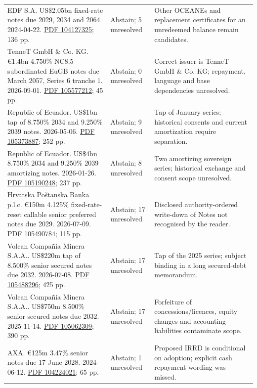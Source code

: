 \documentclass[12pt,a4paper,oneside,openany]{book}
\begin{document}
{\begin{longtable}{P{0.44\textwidth}P{0.12\textwidth}P{0.34\textwidth}}
EDF S.A. US\$2.05bn fixed-rate notes due 2029, 2034 and 2064. 2024-04-22. \href{../prospectus/difficulty-2026-10-04/pdfs/case-104127325.pdf}{PDF 104127325}; 136 pp. & Abstain; 5 unresolved & Other OCEANEs and replacement certificates for an unredeemed balance remain candidates. \\

TenneT GmbH \& Co. KG. €1.4bn 4.750\% NC8.5 subordinated EuGB notes due March 2057, Series 6 tranche 1. 2026-09-01. \href{../prospectus/difficulty-2026-10-04/pdfs/case-105577212.pdf}{PDF 105577212}; 45 pp. & Abstain; 0 unresolved & Correct issuer is TenneT GmbH \& Co. KG; repayment, language and base dependencies unresolved. \\

Republic of Ecuador. US\$1bn tap of 8.750\% 2034 and 9.250\% 2039 notes. 2026-05-06. \href{../prospectus/difficulty-2026-10-04/pdfs/case-105373887.pdf}{PDF 105373887}; 252 pp. & Abstain; 9 unresolved & Tap of January series; historical consents and current amortization require separation. \\

Republic of Ecuador. US\$4bn 8.750\% 2034 and 9.250\% 2039 amortizing notes. 2026-01-26. \href{../prospectus/difficulty-2026-10-04/pdfs/case-105190248.pdf}{PDF 105190248}; 237 pp. & Abstain; 8 unresolved & Two amortizing sovereign series; historical exchange and consent scope unresolved. \\

Hrvatska Poštanska Banka p.l.c. €150m 4.125\% fixed-rate-reset callable senior preferred notes due 2029. 2026-07-09. \href{../prospectus/difficulty-2026-10-04/pdfs/case-105490784.pdf}{PDF 105490784}; 115 pp. & Abstain; 17 unresolved & Disclosed authority-ordered write-down of Notes not recognised by the reader. \\

Volcan Compañía Minera S.A.A.. US\$220m tap of 8.500\% senior secured notes due 2032. 2026-07-08. \href{../prospectus/difficulty-2026-10-04/pdfs/case-105488296.pdf}{PDF 105488296}; 425 pp. & Abstain; 17 unresolved & Tap of the 2025 series; subject binding in a long secured-debt memorandum. \\

Volcan Compañía Minera S.A.A.. US\$750m 8.500\% senior secured notes due 2032. 2025-11-14. \href{../prospectus/difficulty-2026-10-04/pdfs/case-105062309.pdf}{PDF 105062309}; 390 pp. & Abstain; 17 unresolved & Forfeiture of concessions/licences, equity changes and accounting liabilities contaminate scope. \\

AXA. €125m 3.47\% senior notes due 17 June 2028. 2024-06-12. \href{../prospectus/difficulty-2026-10-04/pdfs/case-104224021.pdf}{PDF 104224021}; 65 pp. & Abstain; 1 unresolved & Proposed IRRD is conditional on adoption; explicit cash repayment wording was missed. \\
\bottomrule
\end{longtable}
}
\end{document}
